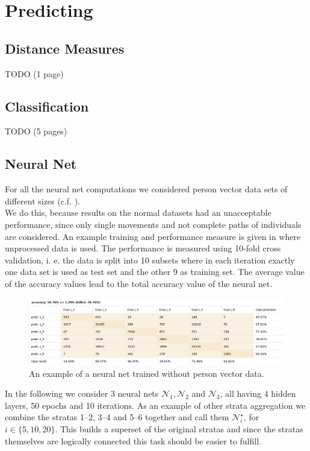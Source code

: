 \documentclass[runningheads]{llncs}
\begin{document}
	\section{Predicting}
	
	\subsection{Distance Measures}
	TODO (1 page)
	
	\subsection{Classification}
	TODO (5 pages)	
%	
	\subsection{Neural Net}
	For all the neural net computations we considered person vector data sets of different sizes (c.f. ).\\
	
	We do this, because results on the normal datasets had an unacceptable performance, since only single movements and not complete paths of individuals are considered. An example training and performance measure is given in  where unprocessed data is used. The performance is measured using 10-fold cross validation, i. e. the data is split into 10 subsets where in each iteration exactly one data set is used as test set and the other 9 as training set. The average value of the accuracy values lead
	 to the total accuracy value of the neural net.
	\begin{figure}[H]
		\centering
		\includegraphics[scale = 0.4]{src/pic/NN_without_vector.png}
		\caption{An example of a neural net trained without person vector data.}
		\label{fig: NN without vector}
	\end{figure}
	
	In the following we consider 3 neural nets $\mathcal{N}_1,\mathcal{N}_2$ and $\mathcal{N}_3$, all having 4 hidden layers, 50 epochs and 10 iterations.	
	As an example of other strata aggregation we combine the stratas 1--2, 3--4 and 5--6 together and call them $\mathcal{N}_i^\star$, for $i \in \{5,10,20\}$. This builds a superset of the original stratas and since the stratas themselves are logically connected this task should be easier to fulfill.\\
	
\end{document}
